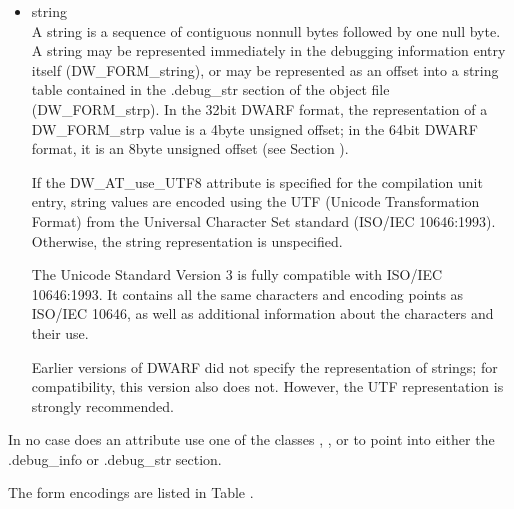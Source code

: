 \begin{itemize}
The use of compilation unit relative references will reduce the
number of link\dash time relocations and so speed up linking. The
use of the second and third type of reference allows for the
sharing of information, such as types, across compilation
units.

A reference to any kind of compilation unit identifies the
debugging information entry for that unit, not the preceding
header.

\item string \\
A string is a sequence of contiguous non\dash null bytes followed by
one null byte. A string may be represented immediately in the
debugging information entry itself (DW\_FORM\_string), or may
be represented as an offset into a string table contained in
the .debug\_str section of the object file (DW\_FORM\_strp). In
the 32\dash bit DWARF format, the representation of a DW\_FORM\_strp
value is a 4\dash byte unsigned offset; in the 64\dash bit DWARF format,
it is an 8\dash byte unsigned offset 
(see Section ).

If the DW\_AT\_use\_UTF8 attribute is specified for the
compilation unit entry, string values are encoded using the
UTF (Unicode Transformation Format) from the Universal
Character Set standard (ISO/IEC 10646:1993). Otherwise,
the string representation is unspecified.

The Unicode Standard Version 3 is fully compatible with
ISO/IEC 10646:1993. It contains all the same characters
and encoding points as ISO/IEC 10646, as well as additional
information about the characters and their use.

Earlier versions of DWARF did not specify the representation
of strings; for compatibility, this version also does
not. However, the UTF representation is strongly recommended.

\end{itemize}

In no case does an attribute use one of the classes ,
,  or  to point into either the
.debug\_info or .debug\_str section.

The form encodings are listed in 
Table .

